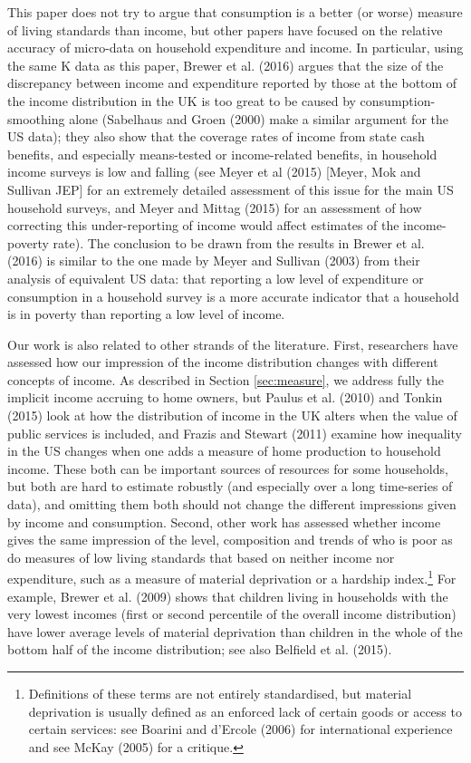 This paper does not try to argue that consumption is a better (or worse) measure of living standards than income, but other papers have focused on the relative accuracy of micro-data on household expenditure and income. In particular, using the same K data as this paper, Brewer et al. (2016) argues that the size of the discrepancy between income and expenditure reported by those at the bottom of the income distribution in the UK is too great to be caused by consumption-smoothing alone (Sabelhaus and Groen (2000) make a similar argument for the US data); they also show that the coverage rates of income from state cash benefits, and especially means-tested or income-related benefits, in household income surveys is low and falling (see Meyer et al (2015) [Meyer, Mok and Sullivan JEP] for an extremely detailed assessment of this issue for the main US household surveys, and Meyer and Mittag (2015) for an assessment of how correcting this under-reporting of income would affect estimates of the income-poverty rate). The conclusion to be drawn from the results in Brewer et al. (2016) is similar to the one made by Meyer and Sullivan (2003) from their analysis of equivalent US data: that reporting a low level of expenditure or consumption in a household survey is a more accurate indicator that a household is in poverty than reporting a low level of income.  

Our work is also related to other strands of the literature. First, researchers have assessed how our impression of the income distribution changes with different concepts of income. As described in Section \ref{sec:measure}, we address fully the implicit income accruing to home owners, but Paulus et al. (2010) and Tonkin (2015) look at how the distribution of income in the UK alters when the value of public services is included, and Frazis and Stewart (2011) examine how inequality in the US changes when one adds a measure of home production to household income. These both can be important sources of resources for some households, but both are hard to estimate robustly (and especially over a long time-series of data), and omitting them both should not change the different impressions given by income and consumption. Second, other work has assessed whether income gives the same impression of the level, composition and trends of who is poor as do measures of low living standards that based on neither income nor expenditure, such as a measure of material deprivation or a hardship index.\footnote{Definitions of these terms are not entirely standardised, but material deprivation is usually defined as an enforced lack of certain goods or access to certain services: see Boarini and d'Ercole (2006) for international experience and see McKay (2005) for a critique.} For example, Brewer et al. (2009) shows that children living in households with the very lowest incomes (first or second percentile of the overall income distribution) have lower average levels of material deprivation than children in the whole of the bottom half of the income distribution; see also Belfield et al. (2015).

